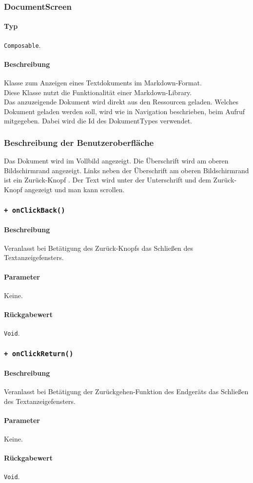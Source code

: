 \subsubsection{DocumentScreen}
\paragraph*{Typ}
\texttt{Composable}.
\paragraph*{Beschreibung}
Klasse zum Anzeigen eines Textdokuments im Markdown-Format.\\
Diese Klasse nutzt die Funktionalität einer Markdown-Library.\\
Das anzuzeigende Dokument wird direkt aus den Ressourcen geladen.
Welches Dokument geladen werden soll, wird wie in Navigation beschrieben, beim Aufruf mitgegeben. 
Dabei wird die Id des DokumentTypes verwendet.

\subsubsection*{Beschreibung der Benutzeroberfläche}
Das Dokument wird im Vollbild angezeigt.
Die Überschrift wird am oberen Bildschirmrand angezeigt.
Links neben der Überschrift am oberen Bildschirmrand ist ein \dq Zurück-Knopf \dq{}.
Der Text wird unter der Unterschrift und dem \dq Zurück-Knopf \dq{} angezeigt und man kann scrollen.

\subsubsection*{\texttt{+ onClickBack()}}%
\paragraph*{Beschreibung}
Veranlasst bei Betätigung des \dq Zurück-Knopfs \dq{} das Schließen des Textanzeigefensters.
\paragraph*{Parameter}
Keine.
\paragraph*{Rückgabewert}
\texttt{Void}.

\subsubsection*{\texttt{+ onClickReturn()}}%
\paragraph*{Beschreibung}
Veranlasst bei Betätigung der Zurückgehen-Funktion des Endgeräts das Schließen des Textanzeigefensters.
\paragraph*{Parameter}
Keine.
\paragraph*{Rückgabewert}
\texttt{Void}.